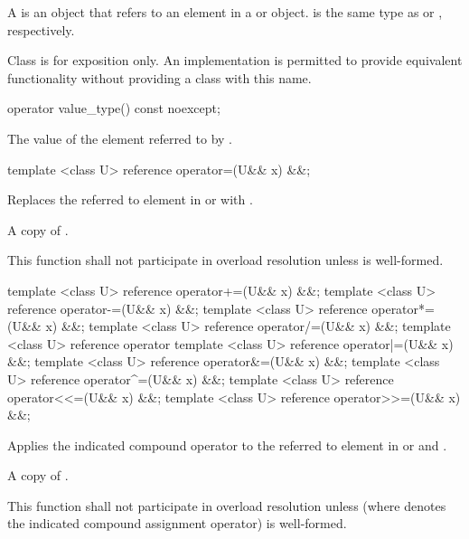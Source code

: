 \label{sec:reference type}
\pnum A  is an object that refers to an element in a \simd or \mask object.
 is the same type as  or , respectively.

\pnum Class  is for exposition only.
An implementation is permitted to provide equivalent functionality without providing a class with this name.



\begin{itemdecl}
operator value_type() const noexcept;
\end{itemdecl}
\begin{itemdescr}
  \pnum\returns The value of the element referred to by .
\end{itemdescr}

\begin{itemdecl}
template <class U> reference operator=(U&& x) &&;
\end{itemdecl}
\begin{itemdescr}
  \pnum\effects Replaces the referred to element in \simd or \mask with .

  \pnum\returns A copy of .

  \pnum\remarks This function shall not participate in overload resolution unless  is well-formed.
\end{itemdescr}

\begin{itemdecl}
template <class U> reference operator+=(U&& x) &&;
template <class U> reference operator-=(U&& x) &&;
template <class U> reference operator*=(U&& x) &&;
template <class U> reference operator/=(U&& x) &&;
template <class U> reference operator%
template <class U> reference operator|=(U&& x) &&;
template <class U> reference operator&=(U&& x) &&;
template <class U> reference operator^=(U&& x) &&;
template <class U> reference operator<<=(U&& x) &&;
template <class U> reference operator>>=(U&& x) &&;
\end{itemdecl}
\begin{itemdescr}
  \pnum\effects Applies the indicated compound operator to the referred to element in \simd or \mask and .

  \pnum\returns A copy of .

  \pnum\remarks This function shall not participate in overload resolution unless  (where  denotes the indicated compound assignment operator) is well-formed.
\end{itemdescr}

